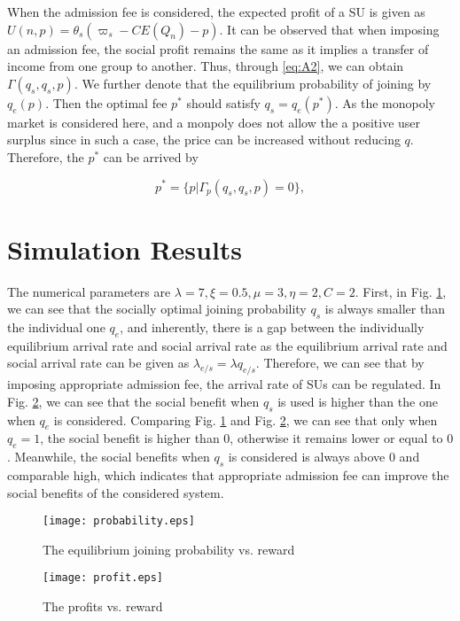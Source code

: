 \documentclass[journal]{IEEEtran}
\begin{document}
When the admission fee is considered, the expected profit of a SU
is given as $U(n,p) = \theta_s (\varpi_s - C E(Q_n)-p)$. It can be
observed that when imposing an admission fee, the social profit
remains the same as it implies a transfer of income from one group
to another. Thus, through \ref{eq:A2}, we can obtain $\Gamma(q_s,
q_s, p)$. We further denote that the equilibrium probability of
joining by $q_e(p)$. Then the optimal fee $p^\ast$ should satisfy
$q_s = q_e(p^\ast)$. As the monopoly market is considered here,
and a monpoly does not allow the a positive user surplus since in
such a case, the price can be increased without reducing $q$.
Therefore, the $p^{\ast}$ can be arrived by

\begin{equation}
 p^{\ast}= \{p \vert \Gamma_p(q_s, q_s,p) = 0\},
\end{equation}


\section{Simulation Results}
The numerical parameters are $\lambda = 7, \xi = 0.5, \mu = 3,
\eta=2, C = 2$. First, in Fig. \ref{fig:3}, we can see that the
socially optimal joining probability $q_s$ is always smaller than
the individual one $q_e$, and inherently, there is a gap between
the individually equilibrium arrival rate and social arrival rate
as the equilibrium arrival rate and social arrival rate can be
given as $\lambda_{e/s} = \lambda q_{e/s}$. Therefore, we can see
that by imposing appropriate admission fee, the arrival rate of
SUs can be regulated. In Fig. \ref{fig:4}, we can see that the
social benefit when $q_s$ is used is higher than the one when
$q_e$ is considered. Comparing Fig. \ref{fig:3} and Fig.
\ref{fig:4}, we can see that only when $q_e=1$, the social benefit
is higher than $0$, otherwise it remains lower or equal to $0$.
Meanwhile, the social benefits when $q_s$ is considered is always
above $0$ and comparable high, which indicates that appropriate
admission fee can improve the social benefits of the considered
system.


\begin{figure}[t]
\centering
\texttt{[image: probability.eps]}
\caption{The equilibrium joining probability vs. reward} \label{fig:3}
\end{figure}


\begin{figure}[t]
\centering
\texttt{[image: profit.eps]}
\caption{The profits vs. reward} \label{fig:4}
\end{figure}
\end{document}
